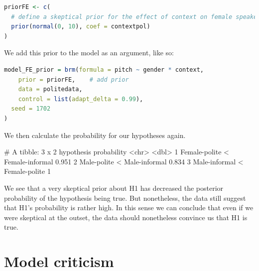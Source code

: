 \documentclass[nobib]{tufte-handout}
\begin{document}
\bigskip

\begin{minipage}[]{1\textwidth}
\begin{lstlisting}[language=R]
priorFE <- c(
  # define a skeptical prior for the effect of context on female speakers
  prior(normal(0, 10), coef = contextpol)
)
\end{lstlisting}
\end{minipage}

We add this prior to the model as an argument, like so:
%
\bigskip

\begin{minipage}[]{1\textwidth}
\begin{lstlisting}[language=R]
model_FE_prior = brm(formula = pitch ~ gender * context,
	prior = priorFE, 	# add prior 
	data = politedata,
	control = list(adapt_delta = 0.99),
  seed = 1702
)    
\end{lstlisting}
\end{minipage}

We then calculate the probability for our hypotheses again. 

\medskip

\begin{minipage}[]{\textwidth}
\begin{rc}
# A tibble: 3 x 2
  hypothesis                      probability
  <chr>                                 <dbl>
1 Female-polite < Female-informal       0.951
2 Male-polite < Male-informal           0.834
3 Male-informal < Female-polite         1   
\end{rc}
\end{minipage}

\noindent We see that a very skeptical prior about H1 has decreased the posterior probability
of the hypothesis being true. But nonetheless, the data still suggest that H1's probability is
rather high. In this sense we can conclude that even if we were skeptical at the outset, the
data should nonetheless convince us that H1 is true.

\section{Model criticism}
\end{document}
